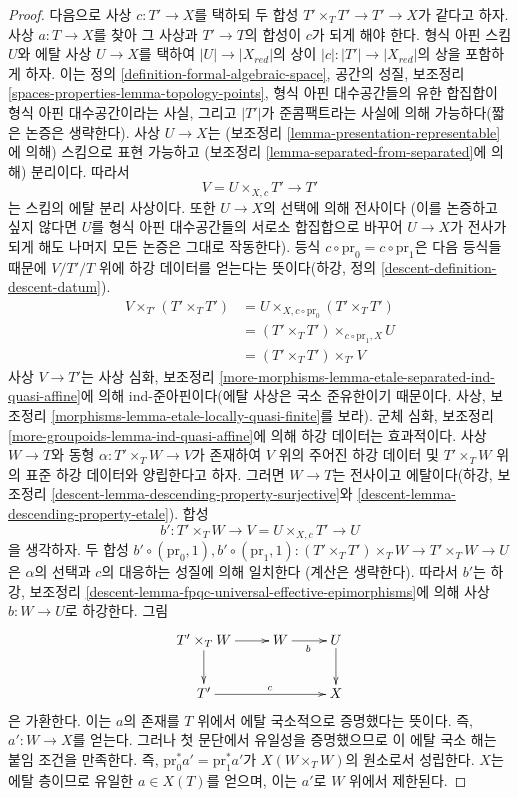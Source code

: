 \begin{proof}
\medskip\noindent
다음으로 사상 $c : T' \to X$를 택하되 두 합성
$T' \times_T T' \to T' \to X$가 같다고 하자. 사상 $a : T \to X$를 찾아 그 사상과
$T' \to T$의 합성이 $c$가 되게 해야 한다. 형식 아핀 스킴 $U$와
에탈 사상 $U \to X$를 택하여 $|U| \to |X_{red}|$의 상이
$|c| : |T'| \to |X_{red}|$의 상을 포함하게 하자. 이는 정의
\ref{definition-formal-algebraic-space}, 공간의 성질, 보조정리
\ref{spaces-properties-lemma-topology-points}, 형식 아핀 대수공간들의
유한 합집합이 형식 아핀 대수공간이라는 사실, 그리고 $|T'|$가
준콤팩트라는 사실에 의해 가능하다(짧은 논증은 생략한다).
사상 $U \to X$는 (보조정리
\ref{lemma-presentation-representable}에 의해) 스킴으로 표현 가능하고
(보조정리 \ref{lemma-separated-from-separated}에 의해) 분리이다. 따라서
$$
V = U \times_{X, c} T' \longrightarrow T'
$$
는 스킴의 에탈 분리 사상이다. 또한 $U \to X$의 선택에 의해 전사이다
(이를 논증하고 싶지 않다면 $U$를 형식 아핀 대수공간들의 서로소 합집합으로
바꾸어 $U \to X$가 전사가 되게 해도 나머지 모든 논증은 그대로 작동한다).
등식 $c \circ \text{pr}_0 = c \circ \text{pr}_1$은 다음 등식들 때문에
$V/T'/T$ 위에 하강 데이터를 얻는다는 뜻이다(하강, 정의
\ref{descent-definition-descent-datum}).
\begin{align*}
V \times_{T'} (T' \times_T T')
& =
U \times_{X, c \circ \text{pr}_0} (T' \times_T T') \\
& =
(T' \times_T T') \times_{c \circ \text{pr}_1, X} U \\
& =
(T' \times_T T') \times_{T'} V
\end{align*}
사상 $V \to T'$는 사상 심화, 보조정리
\ref{more-morphisms-lemma-etale-separated-ind-quasi-affine}에 의해
ind-준아핀이다(에탈 사상은 국소 준유한이기 때문이다. 사상, 보조정리
\ref{morphisms-lemma-etale-locally-quasi-finite}를 보라).
군체 심화, 보조정리 \ref{more-groupoids-lemma-ind-quasi-affine}에 의해
하강 데이터는 효과적이다. 사상 $W \to T$와 동형
$\alpha : T' \times_T W \to V$가 존재하여 $V$ 위의 주어진 하강
데이터 및 $T' \times_T W$ 위의 표준 하강 데이터와 양립한다고 하자.
그러면 $W \to T$는 전사이고 에탈이다(하강, 보조정리
\ref{descent-lemma-descending-property-surjective}와
\ref{descent-lemma-descending-property-etale}). 합성
$$
b' : T' \times_T W \longrightarrow V = U \times_{X, c} T' \longrightarrow U
$$
을 생각하자. 두 합성
$b' \circ (\text{pr}_0, 1),
b' \circ (\text{pr}_1, 1) :
(T' \times_T T') \times_T W \to T' \times_T W \to U$
은 $\alpha$의 선택과 $c$의 대응하는 성질에 의해 일치한다
(계산은 생략한다). 따라서 $b'$는 하강, 보조정리
\ref{descent-lemma-fpqc-universal-effective-epimorphisms}에 의해
사상 $b : W \to U$로 하강한다. 그림
$$
\xymatrix{
T' \times_T W \ar[r] \ar[d] & W \ar[r]_b & U \ar[d] \\
T' \ar[rr]^c &  & X
}
$$
은 가환한다. 이는 $a$의 존재를 $T$ 위에서 에탈 국소적으로
증명했다는 뜻이다. 즉, $a' : W \to X$를 얻는다. 그러나 첫 문단에서
유일성을 증명했으므로 이 에탈 국소 해는 붙임 조건을 만족한다. 즉,
$\text{pr}_0^*a' = \text{pr}_1^*a'$가 $X(W \times_T W)$의 원소로서
성립한다. $X$는 에탈 층이므로 유일한 $a \in X(T)$를 얻으며,
이는 $a'$로 $W$ 위에서 제한된다.
\end{proof}

